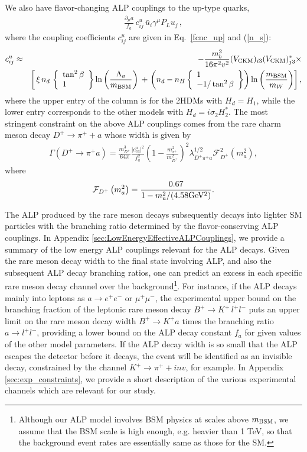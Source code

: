 \documentclass[preprint,prd,aps,tighten,nofootinbib,amssymb]{revtex4}
\newcommand{\bea}{\begin{eqnarray}}
\newcommand{\eea}{\end{eqnarray}}
\def\vpq{f_{a}}
\begin{document}
We also have flavor-changing ALP couplings to the up-type quarks,
\bea
 \frac{\partial_\mu a}{\vpq}\,c^u_{ij}\, \bar{u}_i \gamma^\mu P_L u_j \, ,
\eea
where the coupling coefficients $c^u_{ij}$ are given in Eq.~\eqref{fcnc_up} and (\ref{n_s}):
\bea
c^u_{ij}
&\approx&  -\frac{m_b^2}{16\pi^2 v^2}  (V_{\rm CKM})_{i 3} (V_{\rm CKM})_{j 3}^* 
 \times \nonumber \\ 
 && \left[\,\xi \, n_d \, \left\{ \begin{array}{l}
\tan^2 \beta \\
1
\end{array}\right\}
 \ln\left(\frac{\Lambda_a}{m_{\rm BSM}}\right)\right. \left.+\, \left(n_d-n_H \left\{ \begin{array}{l}
1 \\
-1/\tan^2 \beta
\end{array}\right\}\right)\ln\left(\frac{m_{\rm BSM}}{m_W}\right) 
 \right], \nonumber 
 \eea
where the upper entry of the column is for the 2HDMs with $H_d = H_1$, while the lower entry corresponds to the other models with $H_d = i \sigma_2 H_2^*$. 
The most stringent constraint on the above  ALP couplings comes from the rare charm meson decay  $D^+ \rightarrow \pi^+ + a$ whose width is given by \cite{Fajfer:2015mia}
\bea
\Gamma\left(D^+\rightarrow \pi^+ a\right) =   \frac{m_{D^+}^3}{64\pi} \frac{\left| c^u_{cu}\right|^2}{\vpq^2} \left(1-\frac{m_{\pi^+}^2}{m_{D^+}^2}\right)^2 \lambda^{1/2}_{D^+\pi^+ a}\mathcal{F}_{D^+}^2 \left(m_a^2\right), 
\eea
where
\bea
\mathcal{F}_{D^+} \left(m_a^2\right)  =  \frac{0.67}{1-m_a^2/(4.58 {\rm GeV^2})}  .
\eea

The ALP produced by the rare meson decays subsequently decays into lighter SM particles
with the branching ratio determined by  the flavor-conserving ALP couplings.
In Appendix \ref{sec:LowEnergyEffectiveALPCouplings}, we provide a summary of the low energy ALP couplings  relevant for the ALP decays. 
Given the rare meson decay width to the final state involving ALP, and also the subsequent ALP decay branching ratios,  one can predict an excess in each specific rare meson decay channel over 
the background\footnote{Although our ALP model involves  BSM physics at scales above $m_{\rm BSM}$, we assume that the BSM scale is high enough, e.g. heavier than 1 TeV, so that the background event rates are essentially same as those for the SM.}.   
For instance, if the ALP decays mainly into leptons as $a \rightarrow e^+ e^-$ or $\mu^+ \mu^-$, the experimental upper bound on the branching fraction of the leptonic rare meson decay $B^+\rightarrow K^+\, l^+ l^-$  puts an upper limit on the rare meson decay width $B^+ \rightarrow  K^+ a$ times the branching ratio $a \rightarrow l^+l^-$, providing a lower bound on the ALP decay constant $\vpq$ for given values of the other model parameters.
If the ALP decay width is so small that the ALP escapes the detector before it decays,
the event will be identified as an invisible decay, constrained by the channel $K^+ \rightarrow \pi^+ + inv$, for example.
In Appendix \ref{sec:exp_constraints}, we provide a short description of the various  experimental channels which are relevant for our study. 
\end{document}
